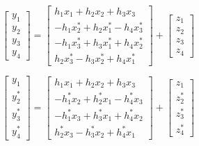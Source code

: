 \documentclass[fleqn]{article}
\begin{document}
\begin{enumerate}
\begin{enumerate}
			\begin{equation*}
				\begin{bmatrix}
					y_1 \\ y_2 \\ y_3 \\ y_4
				\end{bmatrix} = \begin{bmatrix}
					 h_1x_1   + h_2x_2   + h_3x_3 \\
					-h_1x_2^* + h_2x_1^* - h_4x_3^* \\
					-h_1x_3^* + h_3x_1^* + h_4x_2^* \\
					 h_2x_3^* - h_3x_2^* + h_4x_1^*
				\end{bmatrix} + \begin{bmatrix}
					z_1 \\ z_2 \\ z_3 \\ z_4
				\end{bmatrix}
			\end{equation*}
			
			\begin{equation*}
				\begin{bmatrix}
					y_1 \\ y_2^* \\ y_3^* \\ y_4^*
				\end{bmatrix} = \begin{bmatrix}
					 h_1x_1   + h_2x_2   + h_3x_3 \\
					-h_1^*x_2 + h_2^*x_1 - h_4^*x_3 \\
					-h_1^*x_3 + h_3^*x_1 + h_4^*x_2 \\
					 h_2^*x_3 - h_3^*x_2 + h_4^*x_1
				\end{bmatrix} + \begin{bmatrix}
					z_1 \\ z_2^* \\ z_3^* \\ z_4^*
				\end{bmatrix}
			\end{equation*}
			

\end{enumerate}
\end{enumerate}
\end{document}
